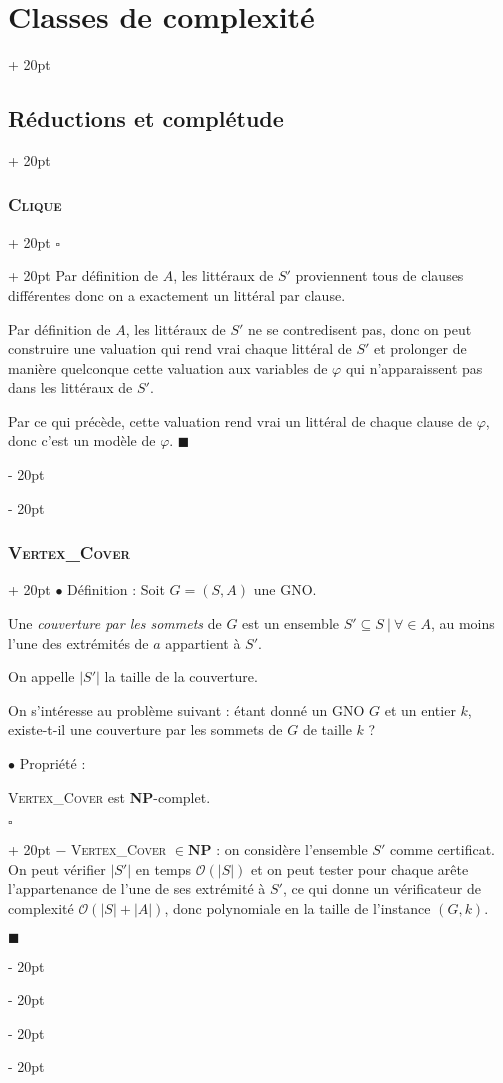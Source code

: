 \documentclass[a4paper, 12pt, twoside]{article}
\newcommand{\abs}[1]{\left\lvert #1 \right\rvert}
\newcommand{\ind}[1][20pt]{\advance\leftskip + #1}
\newcommand{\deind}[1][20pt]{\advance\leftskip - #1}
\newenvironment{indt}[2][20pt]{#2 \par \ind[#1]}{\par \deind} %
\newenvironment{proof}[1][{}]{\begin{indt}{$\square$ #1}}{$\blacksquare$ \end{indt}}
\begin{document}
\begin{indt}{\section{Classes de complexité}}
\begin{indt}{\subsection{Réductions et complétude}}
\begin{indt}{\subsubsection{\textsc{Clique}}}
\begin{proof}
                    \boxed{\Leftarrow}
                    Par définition de $A$, les littéraux de $S'$ proviennent tous de clauses différentes donc on a exactement un littéral par clause.

                    Par définition de $A$, les littéraux de $S'$ ne se contredisent pas, donc on peut construire une valuation qui rend vrai chaque littéral de $S'$ et prolonger de manière quelconque cette valuation aux variables de $\varphi$ qui n'apparaissent pas dans les littéraux de $S'$.

                    Par ce qui précède, cette valuation rend vrai un littéral de chaque clause de $\varphi$, donc c'est un modèle de $\varphi$.
                \end{proof}
            \end{indt}

            \vspace{12pt}
            
            \begin{indt}{\subsubsection{\textsc{Vertex\_Cover}}}
                $\bullet$ Définition : Soit $G = (S, A)$ une GNO.

                Une \emph{couverture par les sommets} de $G$ est un ensemble $S' \subseteq S\ |\ \forall \in A$, au moins l'une des extrémités de $a$ appartient à $S'$.

                On appelle $\abs{S'}$ la taille de la couverture.

                \vspace{6pt}
                
                On s'intéresse au problème suivant : étant donné un GNO $G$ et un entier $k$, existe-t-il une couverture par les sommets de $G$ de taille $k$ ?

                \vspace{12pt}
                
                $\bullet$ Propriété :
                \begin{emphBox}
                    \textsc{Vertex\_Cover} est \textbf{NP}-complet.
                \end{emphBox}

                \vspace{6pt}
                
                \begin{proof}
                    $-$ \textsc{Vertex\_Cover} $\in \mathbf{NP}$ : on considère l'ensemble $S'$ comme certificat.
                    On peut vérifier $\abs{S'}$ en temps $\mathcal O(\abs S)$ et on peut tester pour chaque arête l'appartenance de l'une de ses extrémité à $S'$, ce qui donne un vérificateur de complexité $\mathcal O(\abs S + \abs A)$, donc polynomiale en la taille de l'instance $(G, k)$.


\end{proof}
\end{indt}
\end{indt}
\end{indt}
\end{document}
